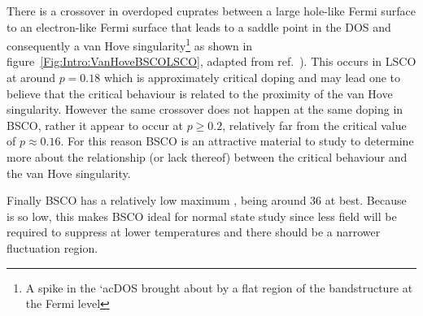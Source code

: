 There is a crossover in overdoped cuprates between a large hole-like Fermi surface to an electron-like Fermi surface that leads to a saddle point in the \ac{DOS} and consequently a van Hove singularity\footnote{A spike in the `ac{DOS} brought about by a flat region of the bandstructure at the Fermi level} as shown in figure~\ref{Fig:Intro:VanHoveBSCOLSCO}, adapted from ref.~\cite{Hashimoto2008}). This occurs in \ac{LSCO} at around $p=0.18$ which is approximately critical doping and may lead one to believe that the critical behaviour is related to the proximity of the van Hove singularity. However the same crossover does not happen at the same doping in \ac{BSCO}, rather it appear to occur at $p \geq 0.2$, relatively far from the critical value of $p \approx 0.16$. For this reason \ac{BSCO} is an attractive material to study to determine more about the relationship (or lack thereof) between the critical behaviour and the van Hove singularity.

Finally \ac{BSCO} has a relatively low maximum \Tc, being around \unit{36}{\kelvin} at best. Because \Tc is so low, this makes \ac{BSCO} ideal for normal state study since less field will be required to suppress \Tc at lower temperatures and there should be a narrower fluctuation region.
